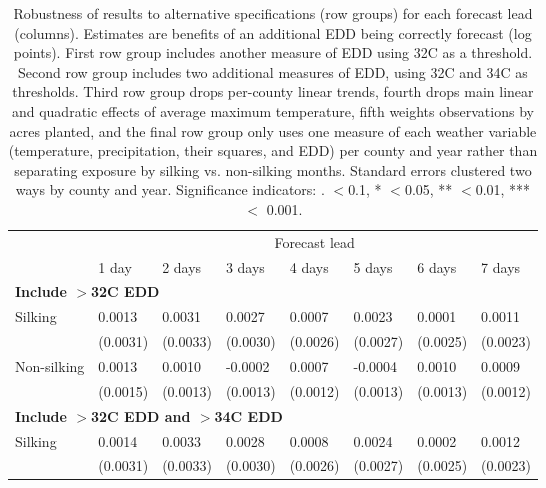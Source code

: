 \begin{table}

\caption{\label{tab:rob}Robustness of results to alternative specifications (row groups)
      for each forecast lead (columns). Estimates are benefits of an additional EDD 
      being correctly forecast (log points). First row group includes
      another measure of EDD using 32C as a threshold. Second row group includes two
      additional measures of EDD, using 32C and 34C as thresholds. Third row group
      drops per-county linear trends, fourth drops main linear and quadratic effects of average maximum temperature,
      fifth weights observations by acres planted,
      and the final row group only uses one measure of 
      each weather variable (temperature, precipitation, their squares, and EDD) per county and year
      rather than separating exposure by silking vs. non-silking months. 
      Standard errors clustered two ways by county and year. 
      Significance indicators: . $<$0.1, * $<$0.05, ** $<$0.01, ***$<$ 0.001.}
\centering
\begin{tabular}[t]{llllllll}
\hline
\multicolumn{1}{c|}{ } & \multicolumn{7}{c}{Forecast lead} \\
  & 1 day & 2 days & 3 days & 4 days & 5 days & 6 days & 7 days\\
\hline
\multicolumn{8}{l}{\textbf{Include $>$32C EDD}}\\
\hline
\hspace{1em}Silking & 0.0013 & 0.0031 & 0.0027 & 0.0007 & 0.0023 & 0.0001 & 0.0011\\
\hspace{1em} & (0.0031) & (0.0033) & (0.0030) & (0.0026) & (0.0027) & (0.0025) & \vphantom{1} (0.0023)\\
\hspace{1em}Non-silking & 0.0013 & 0.0010 & -0.0002 & 0.0007 & -0.0004 & 0.0010 & 0.0009\\
\hspace{1em} & (0.0015) & (0.0013) & (0.0013) & (0.0012) & (0.0013) & (0.0013) & \vphantom{1} (0.0012)\\
\multicolumn{8}{l}{\textbf{Include $>$32C EDD and $>$34C EDD}}\\
\hline
\hspace{1em}Silking & 0.0014 & 0.0033 & 0.0028 & 0.0008 & 0.0024 & 0.0002 & 0.0012\\
\hspace{1em} & (0.0031) & (0.0033) & (0.0030) & (0.0026) & (0.0027) & (0.0025) & (0.0023)\\

\end{tabular}
\end{table}
